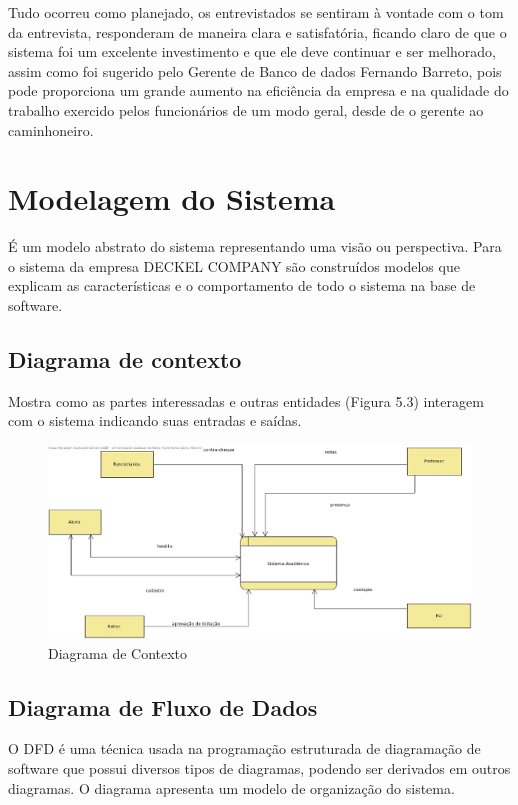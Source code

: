 Tudo ocorreu como planejado, os entrevistados se sentiram à vontade com o tom da entrevista, responderam de maneira clara e satisfatória, ficando claro de que o sistema foi um excelente investimento e que ele deve continuar e ser melhorado, assim como foi sugerido pelo Gerente de Banco de dados Fernando Barreto, pois pode proporciona um grande aumento na eficiência da empresa e na qualidade do trabalho exercido pelos funcionários de um modo geral, desde de o gerente ao caminhoneiro.

\section{Modelagem do Sistema}
É um modelo abstrato do sistema representando uma visão ou perspectiva. Para o sistema da empresa DECKEL COMPANY são construídos modelos que explicam as características e o comportamento de todo o sistema na base de software.

\subsection{Diagrama de contexto}
Mostra como as partes interessadas e outras entidades (Figura 5.3) interagem com o sistema indicando suas entradas e saídas.


 
   \begin{figure}[H]
	      \centering
	       \includegraphics{diagramaContexto.jpg}
	       \caption{Diagrama de Contexto}
	       \label{Diagrama de Contexto}
               \end{figure}

\subsection{Diagrama de Fluxo de Dados}
O DFD é uma técnica usada na programação estruturada de diagramação de software que possui diversos tipos de diagramas, podendo ser derivados em outros diagramas. O diagrama apresenta um modelo de organização do sistema.


